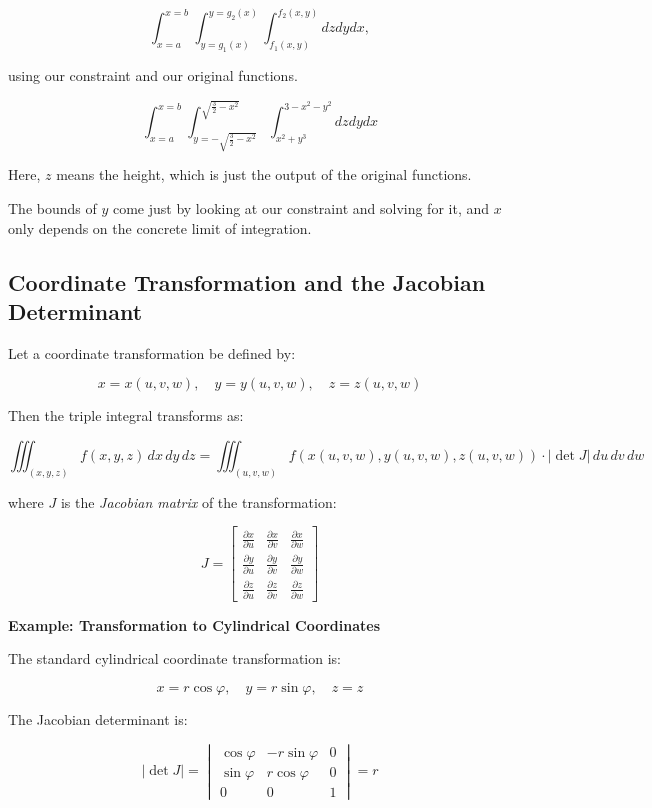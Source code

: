 \[
    \int_{x=a}^{x=b}\int_{y=g_1(x)}^{y=g_2(x)} \int_{f_1(x,y)}^{f_2(x,y)} dz dy dx,
\]

using our constraint and our original functions.

\[
    \int_{x=a}^{x=b}\int_{y=-\sqrt{\frac{3}{2} - x^2}}^{\sqrt{\frac{3}{2} -x^2}} 
    \int_{x^2 + y^3}^{3-x^2-y^2} dz dy dx
\]

Here, \(z\) means the height, which is just the output
of the original functions.

The bounds of \(y\) come just by looking at our constraint and solving for it, and \(x\) only depends on the concrete limit of integration.

\subsection{Coordinate Transformation and the Jacobian Determinant}

Let a coordinate transformation be defined by:

\[
    x = x(u, v, w), \quad y = y(u, v, w), \quad z = z(u, v, w)
\]

Then the triple integral transforms as:

\[
    \iiint_{(x, y, z)} f(x, y, z)\, dx\, dy\, dz = \iiint_{(u, v, w)} f(x(u, v, w), y(u, v, w), 
    z(u, v, w)) \cdot \left| \det J \right|\, du\, dv\, dw
\]

where \( J \) is the \emph{Jacobian matrix} of the transformation:

\[
    J = 
    \begin{bmatrix}
    \frac{\partial x}{\partial u} & \frac{\partial x}{\partial v} & \frac{\partial x}{\partial w} \\
    \frac{\partial y}{\partial u} & \frac{\partial y}{\partial v} & \frac{\partial y}{\partial w} \\
    \frac{\partial z}{\partial u} & \frac{\partial z}{\partial v} & \frac{\partial z}{\partial w}
    \end{bmatrix}
\]

\textbf{Example: Transformation to Cylindrical Coordinates}

The standard cylindrical coordinate transformation is:

\[
    x = r \cos \varphi, \quad y = r \sin \varphi, \quad z = z
\]

The Jacobian determinant is:

\[
    \left| \det J \right| =
    \begin{vmatrix}
    \cos \varphi & -r \sin \varphi & 0 \\
    \sin \varphi & r \cos \varphi & 0 \\
    0 & 0 & 1
    \end{vmatrix}
    = r
\]

